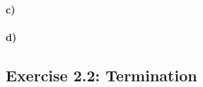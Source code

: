 \documentclass[12pt,a4paper]{article}
\begin{document}
\paragraph{c)} %
\paragraph{d)} %

\subsection*{Exercise 2.2: Termination}
\end{document}
